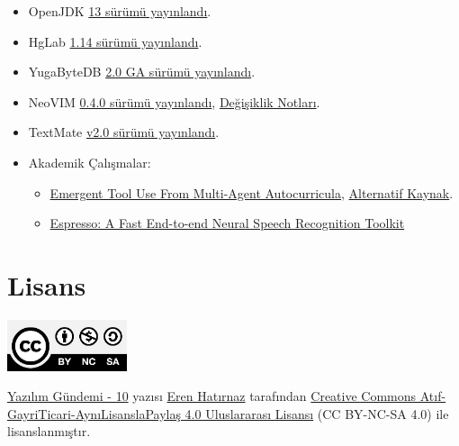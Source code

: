 \documentclass[11pt]{article}
\begin{document}
\begin{itemize}
\item OpenJDK \href{https://openjdk.java.net/projects/jdk/13/}{13 sürümü yayınlandı}.
\item HgLab \href{https://hglabhq.com/blog/2019/9/19/hglab-1-14-released}{1.14 sürümü yayınlandı}.
\item YugaByteDB \href{https://blog.yugabyte.com/announcing-yugabyte-db-2-0-ga-jepsen-tested-high-performance-distributed-sql/}{2.0 GA sürümü yayınlandı}.
\item NeoVIM \href{https://github.com/neovim/neovim/releases/tag/v0.4.0}{0.4.0 sürümü yayınlandı}, \href{https://github.com/neovim/neovim/commit/e2cc5fe09d98ce1ccaaa666a835c896805ccc196}{Değişiklik Notları}.
\item TextMate \href{https://github.com/textmate/textmate/releases/tag/v2.0}{v2.0 sürümü yayınlandı}.
\item Akademik Çalışmalar:
\begin{itemize}
\item \href{https://arxiv.org/abs/1909.07528}{Emergent Tool Use From Multi-Agent Autocurricula}, \href{https://openai.com/blog/emergent-tool-use/}{Alternatif Kaynak}.
\item \href{https://arxiv.org/abs/1909.08723}{Espresso: A Fast End-to-end Neural Speech Recognition Toolkit}
\end{itemize}
\end{itemize}
\section{Lisans}
\label{sec:orgbe272f9}
\begin{center}
\begin{center}
\includegraphics[height=1.5cm]{../../../img/CC_BY-NC-SA_4.0.png}
\end{center}

\href{yazilim-gundemi-10.pdf}{Yazılım Gündemi - 10} yazısı \href{https://erenhatirnaz.github.io}{Eren Hatırnaz} tarafından \href{http://creativecommons.org/licenses/by-nc-sa/4.0/}{Creative Commons
Atıf-GayriTicari-AynıLisanslaPaylaş 4.0 Uluslararası Lisansı} (CC BY-NC-SA 4.0)
ile lisanslanmıştır.
\end{center}
\end{document}
